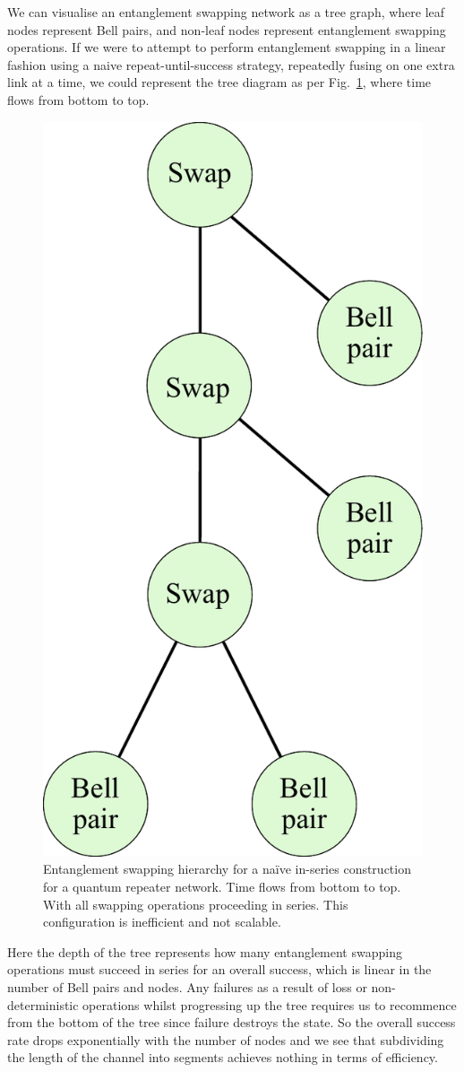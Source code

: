 We can visualise an entanglement swapping network as a tree graph, where leaf nodes represent Bell pairs, and non-leaf nodes represent entanglement swapping operations. If we were to attempt to perform entanglement swapping in a linear fashion using a naive repeat-until-success strategy, repeatedly fusing on one extra link at a time, we could represent the tree diagram as per Fig.~\ref{fig:rep_linear}, where time flows from bottom to top.

\begin{figure}[!htb]
	\centering
	\includegraphics[width=0.5\columnwidth]{figures/Repeater_linear}
	\caption{Entanglement swapping hierarchy for a naïve in-series construction for a quantum repeater network. Time flows from bottom to top. With all swapping operations proceeding in series. This configuration is inefficient and not scalable.} \label{fig:rep_linear}
\end{figure}

Here the depth of the tree represents how many entanglement swapping operations must succeed in series for an overall success, which is linear in the number of Bell pairs and nodes. Any failures as a result of loss or non-deterministic operations whilst progressing up the tree requires us to recommence from the bottom of the tree since failure destroys the state. So the overall success rate drops exponentially with the number of nodes and we see that subdividing the length of the channel into segments achieves nothing in terms of efficiency.

